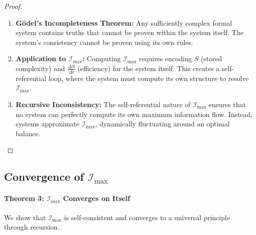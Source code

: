 \documentclass[12pt]{article}
\begin{document}
\begin{proof}
\begin{enumerate}
    \item \textbf{Gödel's Incompleteness Theorem:}
    Any sufficiently complex formal system contains truths that cannot be proven within the system itself. The system's consistency cannot be proven using its own rules.
    
    \item \textbf{Application to \(\mathcal{I}_{\text{max}}\):}
    Computing \(\mathcal{I}_{\text{max}}\) requires encoding \(S\) (stored complexity) and \(\frac{\Delta S}{\Delta t}\) (efficiency) for the system itself. This creates a self-referential loop, where the system must compute its own structure to resolve \(\mathcal{I}_{\text{max}}\).

    \item \textbf{Recursive Inconsistency:}
    The self-referential nature of \(\mathcal{I}_{\text{max}}\) ensures that no system can perfectly compute its own maximum information flow. Instead, systems approximate \(\mathcal{I}_{\text{max}}\), dynamically fluctuating around an optimal balance.
\end{enumerate}
\end{proof}

\subsection{Convergence of \(\mathcal{I}_{\text{max}}\)}

\paragraph{Theorem 3: \(\mathcal{I}_{\text{max}}\) Converges on Itself}
We show that \(\mathcal{I}_{\text{max}}\) is self-consistent and converges to a universal principle through recursion.
\end{document}
